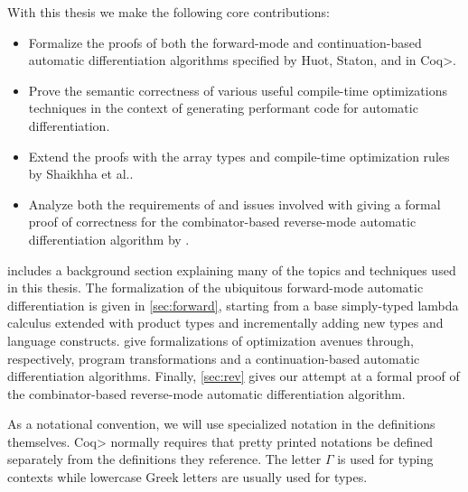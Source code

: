 With this thesis we make the following core contributions:
\begin{itemize}
  \item Formalize the proofs of both the forward-mode and continuation-based automatic differentiation algorithms specified by Huot, Staton, and \Vakar{} \cite{huot2020correctness} in \<Coq>.
  \item Prove the semantic correctness of various useful compile-time optimizations techniques in the context of generating performant code for automatic differentiation.
  \item Extend the proofs with the array types and compile-time optimization rules by Shaikhha et al.\cite{Shaikha2019}.
  \item Analyze both the requirements of and issues involved with giving a formal proof of correctness for the combinator-based reverse-mode automatic differentiation algorithm by \Vakar{}\cite{vkr2020reverse}.
\end{itemize}

 includes a background section explaining many of the topics and techniques used in this thesis. The formalization of the ubiquitous forward-mode automatic differentiation is given in \cref{sec:forward}, starting from a base simply-typed lambda calculus extended with product types and incrementally adding new types and language constructs.  give formalizations of optimization avenues through, respectively, program transformations and a continuation-based automatic differentiation algorithms.
Finally, \cref{sec:rev} gives our attempt at a formal proof of the combinator-based reverse-mode automatic differentiation algorithm.

As a notational convention, we will use specialized notation in the definitions themselves.
\<Coq> normally requires that pretty printed notations be defined separately from the definitions they reference.
The letter $\Gamma$ is used for typing contexts while lowercase Greek letters are usually used for types.
